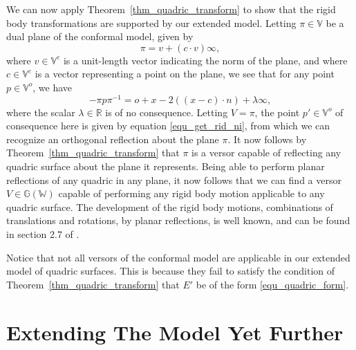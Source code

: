 \documentclass{birkjour}
\theoremstyle{definition}
\theoremstyle{remark}
\numberwithin{equation}{section}
\newcommand{\G}{\mathbb{G}}
\newcommand{\V}{\mathbb{V}}
\newcommand{\W}{\mathbb{W}}
\newcommand{\R}{\mathbb{R}}
\newcommand{\nvao}{o}
\newcommand{\nvai}{\infty}
\begin{document}
We can now apply Theorem~\ref{thm_quadric_transform} to show
that the rigid body transformations are supported by our extended model.
Letting $\pi\in\V$ be a dual plane of the conformal model, given by
\begin{equation}
\pi = v+(c\cdot v)\nvai,
\end{equation}
where $v\in\V^e$ is a unit-length vector indicating the norm of the plane,
and where $c\in\V^e$ is a vector representing a point on the plane,
we see that for any point $p\in\V^o$, we have
\begin{equation}
-\pi p\pi^{-1} = \nvao+x-2((x-c)\cdot n) + \lambda\nvai,
\end{equation}
where the scalar $\lambda\in\R$ is of no consequence.  Letting $V=\pi$,
the point $p'\in\V^o$ of consequence here is given by equation \eqref{equ_get_rid_ni},
from which we can recognize an orthogonal reflection about the plane $\pi$.
It now follows by Theorem~\ref{thm_quadric_transform} that $\pi$ is a versor
capable of reflecting any quadric surface about the plane it represents.
Being able to perform planar reflections of any quadric in any plane, it
now follows that we can find a versor $V\in\G(\W)$ capable of performing
any rigid body motion applicable to any quadric surface.  The development
of the rigid body motions, combinations of translations and rotations, by planar reflections,
is well known, and can be found in section 2.7 of \cite{LiRockwood}.

Notice that not all versors of the conformal model are applicable in
our extended model of quadric surfaces.  This is because they fail to
satisfy the condition of Theorem~\ref{thm_quadric_transform} that $E'$ be
of the form \eqref{equ_quadric_form}.

\section{Extending The Model Yet Further}
\end{document}
